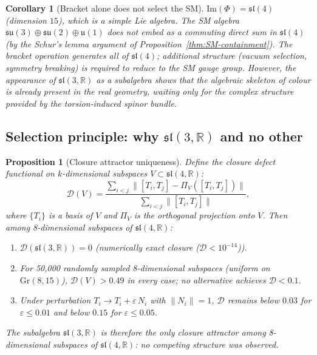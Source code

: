 \documentclass[11pt,a4paper]{article}
\theoremstyle{plain}
\newtheorem{corollary}[theorem]{Corollary}
\newtheorem{proposition}[theorem]{Proposition}
\theoremstyle{definition}
\theoremstyle{remark}
\newcommand{\eps}{\varepsilon}
\begin{document}
\begin{corollary}[Bracket alone does not select the SM]
$\mathrm{Im}(\Phi) = \mathfrak{sl}(4)$ (dimension $15$), which is a simple Lie algebra.
The SM algebra $\mathfrak{su}(3) \oplus \mathfrak{su}(2) \oplus \mathfrak{u}(1)$
does not embed as a commuting direct sum in $\mathfrak{sl}(4)$ 
(by the Schur's lemma argument of Proposition~\ref{thm:SM-containment}).
The bracket operation generates \emph{all} of $\mathfrak{sl}(4)$;
additional structure (vacuum selection, symmetry breaking) is required 
to reduce to the SM gauge group.  However, the appearance of $\mathfrak{sl}(3,\mathbb{R})$
as a subalgebra shows that the algebraic skeleton of colour is already present in the
real geometry, waiting only for the complex structure provided by the torsion‑induced
spinor bundle.
\end{corollary}

\subsection{Selection principle: why $\mathfrak{sl}(3,\mathbb{R})$ and no other}

\begin{proposition}[Closure attractor uniqueness]\label{prop:selection}
Define the closure defect functional on $k$-dimensional subspaces $V \subset \mathfrak{sl}(4,\mathbb{R})$:
\[
  \mathcal{D}(V) = \frac{\sum_{i<j} \| [T_i, T_j] - \Pi_V([T_i, T_j]) \|}{\sum_{i<j} \|[T_i, T_j]\|},
\]
where $\{T_i\}$ is a basis of $V$ and $\Pi_V$ is the orthogonal projection onto $V$.
Then among 8-dimensional subspaces of $\mathfrak{sl}(4,\mathbb{R})$:
\begin{enumerate}[label=(\roman*),noitemsep]
  \item $\mathcal{D}(\mathfrak{sl}(3,\mathbb{R})) = 0$ (numerically exact closure ($\mathcal{D} < 10^{-14}$)).
  \item For 50,000 randomly sampled 8-dimensional subspaces (uniform on $\mathrm{Gr}(8,15)$),
    $\mathcal{D}(V) > 0.49$ in every case; no alternative achieves
    $\mathcal{D} < 0.1$.
  \item Under perturbation $T_i \to T_i + \eps\,N_i$ with
    $\|N_i\| = 1$, $\mathcal{D}$ remains below $0.03$ for
    $\eps \leq 0.01$ and below $0.15$ for $\eps \leq 0.05$.
\end{enumerate}
The subalgebra $\mathfrak{sl}(3,\mathbb{R})$ is therefore the only
closure attractor among 8-dimensional subspaces of $\mathfrak{sl}(4,\mathbb{R})$:
no competing structure was observed.
\end{proposition}
\end{document}
